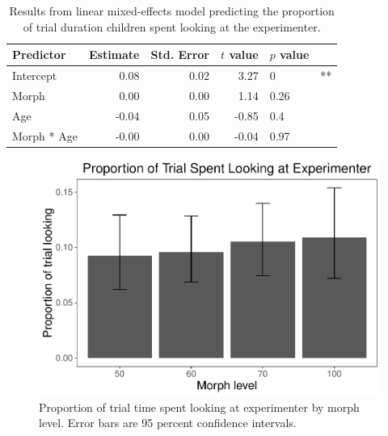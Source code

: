 \documentclass[,man,floatsintext]{apa6}
\begin{document}
\begin{table}[ht]
\centering
\caption{Results from linear mixed-effects model predicting the proportion of trial duration children spent looking at the experimenter.} 
\begin{tabular}{lrrrll}
  \hline
Predictor & Estimate & Std. Error & $t$ value & $p$ value &   \\ 
  \hline
Intercept & 0.08 & 0.02 & 3.27 & 0 & ** \\ 
  Morph & 0.00 & 0.00 & 1.14 & 0.26 &  \\ 
  Age & -0.04 & 0.05 & -0.85 & 0.4 &  \\ 
  Morph * Age & -0.00 & 0.00 & -0.04 & 0.97 &  \\ 
   \hline
\end{tabular}
\end{table}

\begin{figure}
\centering
\includegraphics{soc_ref_category_paper_files/figure-latex/morphlooking-1.pdf}
\caption{\label{fig:morphlooking}Proportion of trial time spent looking at experimenter by morph level. Error bars are 95 percent confidence intervals.}
\end{figure}
\end{document}
